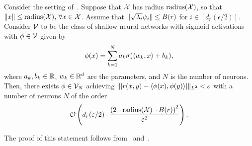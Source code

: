 \begin{corollary}\label{cor:sym_iprod_kernel_barron_neuron_bound}
	Consider the setting of~. Suppose that ${\mathcal{X}}$ has radius $\mathrm{radius}({\mathcal{X}})$, so that $\lVert x\rVert \leq \mathrm{radius}({\mathcal{X}}),\, \forall x \in {\mathcal{X}}$. Assume that $\lVert\sqrt{\lambda_i} \psi_i\rVert \leq B(r)$ for $i \in [d_r(\epsilon/2)]$. Consider ${\mathcal{V}}$ to be the class of shallow neural networks with sigmoid activations with $\phi \in {\mathcal{V}}$ given by
	\begin{equation*}
		\phi(x) = \sum_{k=1}^{N} a_k \sigma(\iprod{w_k}{x} + b_k),
	\end{equation*}
	where $a_k, b_k \in \mathbb{R}$, $w_k \in \mathbb{R}^{d}$ are the parameters, and $N$ is the number of neurons. Then, there exists $\phi \in {\mathcal{V}}_N$ achieving $\lVert\left\lvert r(x,y) - \left \langle \phi(x), \phi(y) \right\rangle\right\rvert\rVert_{L^2} < \varepsilon$ with a number of neurons $N$ of the order
	\[{\mathcal{O}}\left(d_r(\varepsilon / 2) \cdot \frac{\left(2\, \cdot \mathrm{radius}({\mathcal{X}})\, \cdot B(r)\right)^2}{\varepsilon^2}\right).\]
\end{corollary}
The proof of this statement follows from~ and~\textcite{barronUniversalApproximation1993}.

